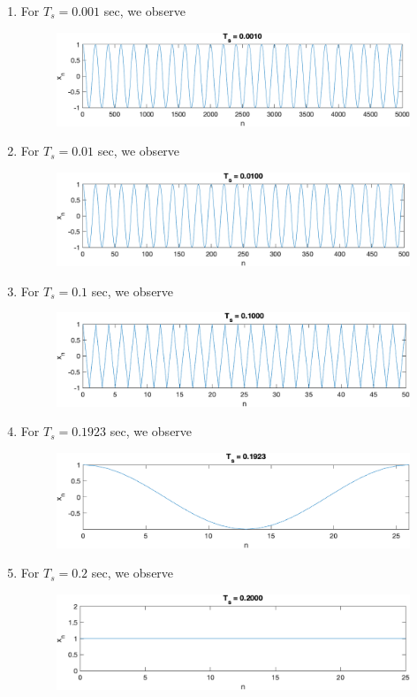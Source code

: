 \documentclass[12pt]{article}
\begin{document}
\begin{enumerate}[label=\textbf{\alph*)}, leftmargin=2.6em]
\item For $T_s=0.001$ sec, we observe
\begin{figure} [H]
    \centering
    \includegraphics[width=0.8\linewidth]{1a.png}
\end{figure}
\item For $T_s=0.01$ sec, we observe
\begin{figure} [H]
    \centering
    \includegraphics[width=0.8\linewidth]{1b.png}
\end{figure}
\item For $T_s=0.1$ sec, we observe
\begin{figure} [H]
    \centering
    \includegraphics[width=0.8\linewidth]{1c.png}
\end{figure}
\item For $T_s=0.1923$ sec, we observe
\begin{figure} [H]
    \centering
    \includegraphics[width=0.8\linewidth]{1d.png}
\end{figure}
\item For $T_s=0.2$ sec, we observe
\begin{figure} [H]
    \centering
    \includegraphics[width=0.8\linewidth]{1e.png}
\end{figure}


\end{enumerate}
\end{document}
